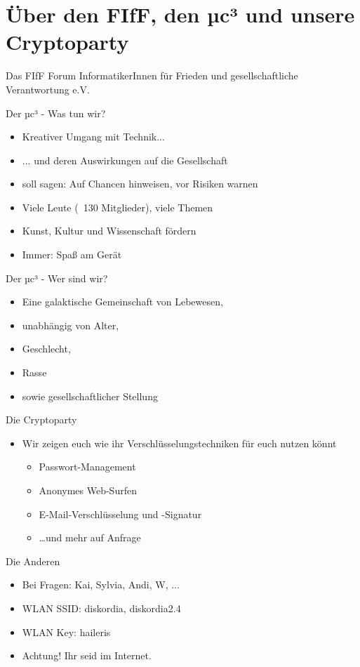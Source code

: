 \section{Über den FIfF, den µc³ und unsere Cryptoparty}
  \begin{frame}{Das FIfF}
    Forum InformatikerInnen für Frieden und gesellschaftliche Verantwortung e.V.
  \end{frame}
  \begin{frame}{Der µc³ - Was tun wir?}
    \begin{itemize}
      \item{Kreativer Umgang mit Technik...}
      \item{... und deren Auswirkungen auf die Gesellschaft}
      \item{soll sagen: Auf Chancen hinweisen, vor Risiken warnen}
      \item{Viele Leute (~130 Mitglieder), viele Themen}
      \item{Kunst, Kultur und Wissenschaft fördern}
      \item{Immer: Spaß am Gerät}
    \end{itemize}
  \end{frame}
  \begin{frame}{Der µc³ - Wer sind wir?}
    \begin{itemize}
      \item{Eine galaktische Gemeinschaft von Lebewesen,}
      \item{unabhängig von Alter,}
      \item{Geschlecht,}
      \item{Rasse}
      \item{sowie gesellschaftlicher Stellung}
    \end{itemize}
  \end{frame}
  \begin{frame}{Die Cryptoparty}
    \begin{itemize}
      \item{Wir zeigen euch wie ihr Verschlüsselungstechniken für euch nutzen könnt}
      \begin{itemize}
        \item{Passwort-Management}
        \item{Anonymes Web-Surfen}
        \item{E-Mail-Verschlüsselung und -Signatur}
        \item{\ldots und mehr auf Anfrage}
      \end{itemize}
    \end{itemize}
  \end{frame}
  \begin{frame}{Die Anderen}
    \begin{itemize}
      \item{Bei Fragen: Kai, Sylvia, Andi, W, ...}
      \item{WLAN SSID: diskordia, diskordia2.4}
      \item{WLAN Key: haileris}
      \item{Achtung! Ihr seid im Internet.}
    \end{itemize}
  \end{frame}


